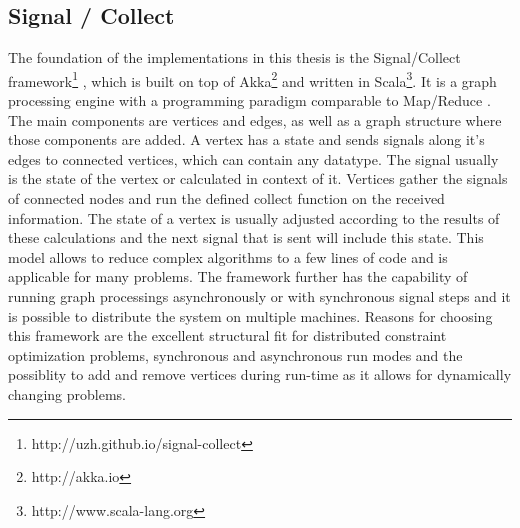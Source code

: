 \subsection{Signal / Collect}
The foundation of the implementations in this thesis is the Signal/Collect framework\footnote{http://uzh.github.io/signal-collect} \cite{Stutz2010}, which is built on top of Akka\footnote{http://akka.io} and written in Scala\footnote{http://www.scala-lang.org}. It is a graph processing engine with a programming paradigm comparable to Map/Reduce \cite{Dean2008}. The main components are vertices and edges, as well as a graph structure where those components are added. A vertex has a state and sends signals along it's edges to connected vertices, which can contain any datatype. The signal usually is the state of the vertex or calculated in context of it. Vertices gather the signals of connected nodes and run the defined collect function on the received information. The state of a vertex is usually adjusted according to the results of these calculations and the next signal that is sent will include this state.  This model allows to reduce complex algorithms to a few lines of code and is applicable for many problems. The framework further has the capability of running graph processings asynchronously or with synchronous signal steps and it is possible to distribute the system on multiple machines. Reasons for choosing this framework are the excellent structural fit for distributed constraint optimization problems, synchronous and asynchronous run modes and the possiblity to add and remove vertices during run-time as it allows for dynamically changing problems.

